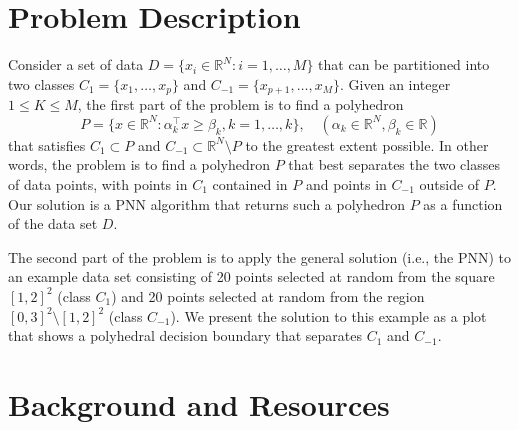 \documentclass[12pt, a4paper, notitlepage]{report}
\newcommand{\RR}{\mathbb{R}}
\begin{document}
\newpage %

\section{Problem Description} \label{Problem}

Consider a set of data $D = \{x_i\in\RR^N:i=1,\ldots,M\}$ that can be partitioned into two classes $C_1=\{x_1,\ldots,x_p\}$ and $C_{-1}=\{x_{p+1},\ldots,x_M\}$. Given an integer $1\leq K\leq M$, the first part of the problem is to find a polyhedron
\[ P = \{x\in\RR^N: \alpha_k^\top x\geq \beta_k, k=1,\ldots,k\}, \quad
(\alpha_k\in\RR^N, \beta_k\in\RR) \]
that satisfies $C_1\subset P$ and $C_{-1}\subset \RR^N\setminus P$ to the greatest extent possible. In other words, the problem is to find a polyhedron $P$ that best separates the two classes of data points, with points in $C_1$ contained in $P$ and points in $C_{-1}$ outside of $P$. Our solution is a PNN algorithm that returns such a polyhedron $P$ as a function of the data set $D$.

The second part of the problem is to apply the general solution (i.e., the PNN) to an example data set consisting of 20 points selected at random from the square $[1, 2]^2$ (class $C_1$) and 20 points selected at random from the region $[0,3]^2\setminus [1,2]^2$ (class $C_{-1}$). We present the solution to this example as a plot that shows a polyhedral decision boundary that separates $C_1$ and $C_{-1}$.

\section{Background and Resources} \label{Background}
\end{document}
